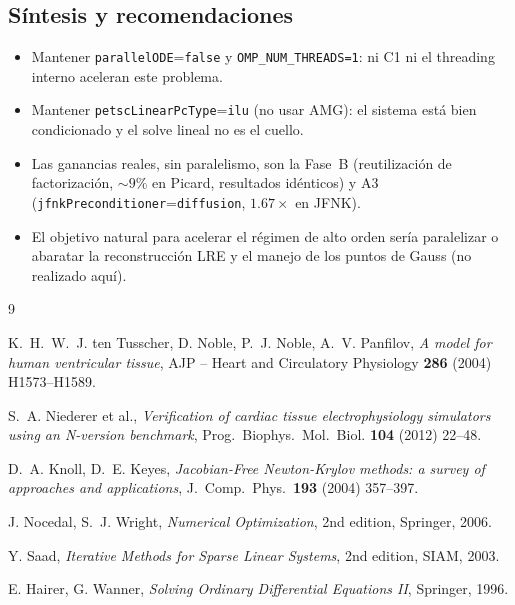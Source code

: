 \documentclass[11pt,a4paper]{article}
\newcommand{\code}[1]{\texttt{\small #1}}
\newcommand{\dictkey}[1]{\textcolor{black!60!green}{\texttt{\footnotesize #1}}}
\begin{document}
\subsection{Síntesis y recomendaciones}
\label{sec:exp-sintesis}

\begin{itemize}[nosep]
  \item Mantener \dictkey{parallelODE}=\code{false} y \code{OMP\_NUM\_THREADS=1}:
        ni C1 ni el threading interno aceleran este problema.
  \item Mantener \dictkey{petscLinearPcType}=\code{ilu} (no usar AMG): el sistema
        está bien condicionado y el solve lineal no es el cuello.
  \item Las ganancias reales, sin paralelismo, son la Fase~B
        (reutilización de factorización, $\sim 9\%$ en Picard, resultados
        idénticos) y A3 (\dictkey{jfnkPreconditioner}=\code{diffusion},
        $1.67\times$ en JFNK).
  \item El objetivo natural para acelerar el régimen de alto orden sería paralelizar
        o abaratar la reconstrucción LRE y el manejo de los puntos de Gauss (no
        realizado aquí).
\end{itemize}

\begin{thebibliography}{9}

 K.~H.~W.~J. ten Tusscher, D. Noble, P.~J. Noble, A.~V.
    Panfilov, \emph{A model for human ventricular tissue},
    AJP -- Heart and Circulatory Physiology
    \textbf{286} (2004) H1573--H1589.

 S.~A. Niederer et al.,
    \emph{Verification of cardiac tissue electrophysiology simulators
    using an N-version benchmark}, Prog.\ Biophys.\ Mol.\ Biol.
    \textbf{104} (2012) 22--48.

 D.~A. Knoll, D.~E. Keyes,
    \emph{Jacobian-Free Newton-Krylov methods: a survey of approaches
    and applications}, J.\ Comp.\ Phys.\ \textbf{193}
    (2004) 357--397.

 J. Nocedal, S.~J. Wright,
    \emph{Numerical Optimization}, 2nd edition, Springer, 2006.

 Y. Saad,
    \emph{Iterative Methods for Sparse Linear Systems}, 2nd edition,
    SIAM, 2003.

 E. Hairer, G. Wanner,
    \emph{Solving Ordinary Differential Equations II}, Springer, 1996.

\end{thebibliography}
\end{document}
